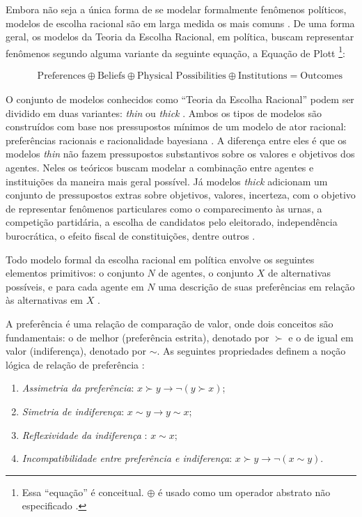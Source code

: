 Embora não seja a única forma de se modelar formalmente fenômenos políticos,
modelos de escolha racional são em larga medida os mais comuns
\cite{austen1998social}. De uma forma geral, os modelos da Teoria da Escolha
Racional, em política, buscam representar fenômenos segundo alguma variante da
seguinte equação, a Equação de Plott \cite{munger2015choosing,
  ostrom1986agenda}\footnote{Essa ``equação'' é conceitual. \(\oplus\) é usado como
  um operador abstrato não especificado \cite{ostrom1986agenda}. }:
\begin{figure}[H]
\begin{align*}
  \text{Preferences} \oplus \text{Beliefs}  \oplus  \text{Physical Possibilities} \oplus \text{Institutions} = \text{Outcomes}
\end{align*}
\end{figure}
O conjunto de modelos conhecidos como ``Teoria da Escolha Racional'' podem ser
dividido em duas variantes: \textit{thin} ou \textit{thick}
\cite{hechter1997sociological, green1996pathologies}. Ambos os tipos de modelos
são construídos com base nos pressupostos mínimos de um modelo de ator racional:
preferências racionais e racionalidade bayesiana \cite{gintis2016individuality}.
A diferença entre eles é que os modelos \textit{thin} não fazem pressupostos
substantivos sobre os valores e objetivos dos agentes. Neles os teóricos buscam
modelar a combinação entre agentes e instituições da maneira mais geral
possível. Já modelos \textit{thick} adicionam um conjunto de pressupostos extras
sobre objetivos, valores, incerteza, com o objetivo de representar fenômenos
particulares como o comparecimento às urnas, a competição partidária, a escolha
de candidatos pelo eleitorado, independência burocrática, o efeito fiscal de
constituições, dentre outros \cite{bendor2011behavioral}.

Todo modelo formal da escolha racional em política envolve os seguintes
elementos primitivos: o conjunto $N$ de agentes, o conjunto \(X\) de
alternativas possíveis, e para cada agente em \(N\) uma descrição de suas
preferências em relação às alternativas em \(X\) \cite[p.
263]{austen1998social}.

A preferência é uma relação de comparação de valor, onde dois conceitos são
fundamentais: o de melhor (preferência estrita), denotado por \(\succ\) e o de igual
em valor (indiferença), denotado por \(\sim\). As seguintes propriedades definem a
noção lógica de relação de preferência \cite{sep-preferences}:

\begin{enumerate}
\item \textit{Assimetria da preferência}: \( x \succ y \to \neg (y \succ x )\); 
\item \textit{Simetria de indiferença}: \(x \sim y \to  y \sim x\); 
\item \textit{Reflexividade da indiferença }: \(x \sim x\); 
\item \textit{Incompatibilidade entre preferência e indiferença}: \(x \succ y \to \neg ( x
  \sim y)\).
\end{enumerate}


